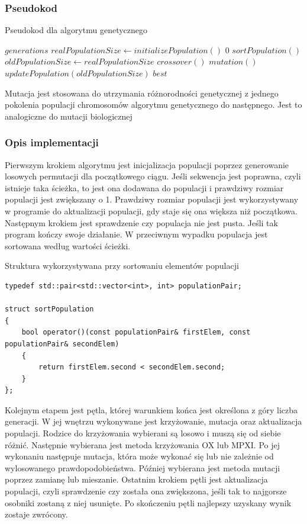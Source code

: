 \documentclass[12pt,a4paper,titlepage]{article}
\begin{document}
\subsubsection{Pseudokod}
\begin{algorithm}[H]
\caption{Pseudokod dla algorytmu genetycznego}
\begin{algorithmic}
\Require $generations$
\State $realPopulationSize \gets initializePopulation()$
    \State \Return $0$
\EndIf
\State $sortPopulation()$
    \State $oldPopulationSize \gets realPopulationSize$
    \State $crossover()$
    \State $mutation()$
    \State $updatePopulation(oldPopulationSize)$
\EndFor
\State \Return $best$
\end{algorithmic}
\end{algorithm}

Mutacja jest stosowana do utrzymania różnorodności genetycznej z jednego pokolenia populacji chromosomów algorytmu genetycznego do następnego. Jest to analogiczne do mutacji biologicznej

\subsubsection{Opis implementacji}
Pierwszym krokiem algorytmu jest inicjalizacja populacji poprzez generowanie losowych permutacji dla początkowego ciągu. Jeśli sekwencja jest poprawna, czyli istnieje taka ścieżka, to jest ona dodawana do populacji i prawdziwy rozmiar populacji jest zwiększany o 1. Prawdziwy rozmiar populacji jest wykorzystywany w programie do aktualizacji populacji, gdy staje się ona większa niż początkowa. Następnym krokiem jest sprawdzenie czy populacja nie jest pusta. Jeśli tak program kończy swoje działanie. W przeciwnym wypadku populacja jest sortowana według wartości ścieżki.

\begin{listing}[H]
\caption{Struktura wykorzystywana przy sortowaniu elementów populacji}
\begin{verbatim}
typedef std::pair<std::vector<int>, int> populationPair;

struct sortPopulation
{
    bool operator()(const populationPair& firstElem, const populationPair& secondElem)
    {
        return firstElem.second < secondElem.second;
    }
};
\end{verbatim}
\end{listing}
Kolejnym etapem jest pętla, której warunkiem końca jest określona z góry liczba generacji. W jej wnętrzu wykonywane jest krzyżowanie, mutacja oraz aktualizacja populacji. Rodzice do krzyżowania wybierani są losowo i muszą się od siebie różnić. Następnie wybierana jest metoda krzyżowania OX lub MPXI. Po jej wykonaniu następuje mutacja, która może wykonać się lub nie zależnie od wylosowanego prawdopodobieństwa. Później wybierana jest metoda mutacji poprzez zamianę lub mieszanie. Ostatnim krokiem pętli jest aktualizacja populacji, czyli sprawdzenie czy została ona zwiększona, jeśli tak to najgorsze osobniki zostaną z niej usunięte. Po skończeniu pętli najlepszy uzyskany wynik zostaje zwrócony.
\end{document}
